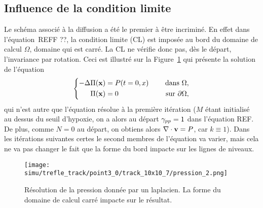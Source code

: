 \documentclass[main.tex]{subfiles}
\begin{document}
\subsection{Influence de la condition limite}
Le schéma associé à la diffusion a été le premier à être incriminé. En effet dans l'équation~REFF ??, la condition limite (CL) est imposée au bord du domaine de calcul $\Omega$, domaine qui est carré. La CL ne vérifie donc pas, dès le départ, l'invariance par rotation. Ceci est illustré sur la Figure~\ref{fig:ligne_nvx_laplace_carre} qui présente la solution de l'équation
\begin{equation}\label{eq:pression_iter1}
\left\{
\begin{aligned}
-\Delta \Pi(\mathbf{x}) &= P(t=0,x) & \quad \textrm{ dans }  \Omega , \\
\Pi(\mathbf{x}) &=0 & \quad \textrm{ sur  } \partial \Omega,
\end{aligned}
\right.
\end{equation}
qui n'est autre que l'équation résolue à la première itération ($M$ étant initialisé au dessus du seuil d'hypoxie, on a alors au départ $\gamma_{pp}=1$ dans l'équation REF. De plus, comme $N=0$ au départ, on obtiens alors $\nabla\cdot \mathbf{v} = P$, car $k\equiv1$). Dans les itérations suivantes certes le second membres de l'équation va varier, mais cela ne va pas changer le fait que la forme du bord impacte sur les lignes de niveaux.
\begin{figure}
\centering
\texttt{[image: simu/trefle\_track/point3\_0/track\_10x10\_7/pression\_2.png]}
\vspace{-4mm}\\
\caption{\label{fig:ligne_nvx_laplace_carre} Résolution de la pression donnée par un laplacien. La forme du domaine de calcul carré impacte sur le résultat.}
\end{figure}
\end{document}

